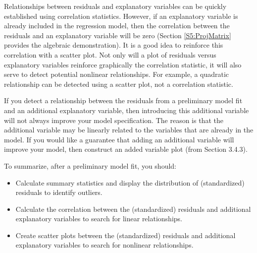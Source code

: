 Relationships between residuals and explanatory variables can be
quickly established using correlation statistics. However, if an
explanatory variable is already included in the regression model,
then the correlation between the residuals and an explanatory
variable will be zero (Section \ref{S5:ProjMatrix} provides the
algebraic demonstration). It is a good idea to reinforce this
correlation with a scatter plot. Not only will a plot of residuals
versus explanatory variables reinforce graphically the correlation
statistic, it will also serve to detect potential nonlinear
relationships. For example, a quadratic relationship can be detected
using a scatter plot, not a correlation statistic.

If you detect a relationship between the residuals from a
preliminary model fit and an additional explanatory variable, then
introducing this additional variable will not always improve your
model specification. The reason is that the additional variable may
be linearly related to the variables that are already in the model.
If you would like a guarantee that adding an additional variable
will improve your model, then construct an added variable plot (from
Section 3.4.3). 

To summarize, after a preliminary model fit, you should:
\begin{itemize}
\item Calculate summary statistics and display the distribution of
(standardized) residuals to identify outliers.

\item  Calculate the correlation between the (standardized) residuals and
additional explanatory variables to search for linear relationships.

\item  Create scatter plots between the (standardized) residuals and additional
explanatory variables to search for nonlinear relationships.
\end{itemize}

\linejed

